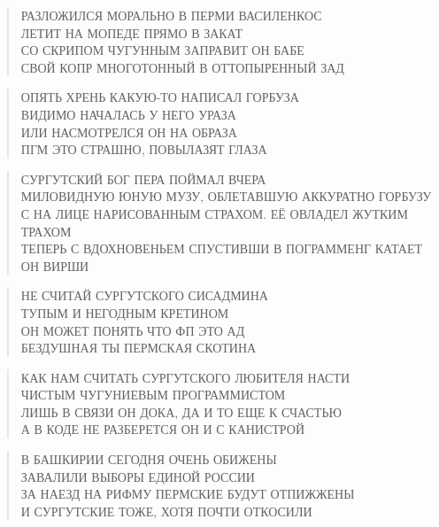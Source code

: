 \poemtitle{***}
\begin{verse}
РАЗЛОЖИЛСЯ МОРАЛЬНО В ПЕРМИ ВАСИЛЕНКОС\\
ЛЕТИТ НА МОПЕДЕ ПРЯМО В ЗАКАТ\\
СО СКРИПОМ ЧУГУННЫМ ЗАПРАВИТ ОН БАБЕ\\
СВОЙ КОПР МНОГОТОННЫЙ В ОТТОПЫРЕННЫЙ ЗАД
\end{verse}

\poemtitle{***}
\begin{verse}
ОПЯТЬ ХРЕНЬ КАКУЮ-ТО НАПИСАЛ ГОРБУЗА\\
ВИДИМО НАЧАЛАСЬ У НЕГО УРАЗА\\
ИЛИ НАСМОТРЕЛСЯ ОН НА ОБРАЗА\\
ПГМ ЭТО СТРАШНО, ПОВЫЛАЗЯТ ГЛАЗА
\end{verse}

\poemtitle{***}
\begin{verse}
СУРГУТСКИЙ БОГ ПЕРА ПОЙМАЛ ВЧЕРА\\
МИЛОВИДНУЮ ЮНУЮ МУЗУ, ОБЛЕТАВШУЮ АККУРАТНО ГОРБУЗУ\\
С НА ЛИЦЕ НАРИСОВАННЫМ СТРАХОМ. ЕЁ ОВЛАДЕЛ ЖУТКИМ ТРАХОМ\\
ТЕПЕРЬ С ВДОХНОВЕНЬЕМ СПУСТИВШИ В ПОГРАММЕНГ КАТАЕТ ОН ВИРШИ
\end{verse}

\poemtitle{***}
\begin{verse}
НЕ СЧИТАЙ СУРГУТСКОГО СИСАДМИНА\\
ТУПЫМ И НЕГОДНЫМ КРЕТИНОМ\\
ОН МОЖЕТ ПОНЯТЬ ЧТО ФП ЭТО АД\\
БЕЗДУШНАЯ ТЫ ПЕРМСКАЯ СКОТИНА
\end{verse}

\poemtitle{***}
\begin{verse}
КАК НАМ СЧИТАТЬ СУРГУТСКОГО ЛЮБИТЕЛЯ НАСТИ\\
ЧИСТЫМ ЧУГУНИЕВЫМ ПРОГРАММИСТОМ\\
ЛИШЬ В СВЯЗИ ОН ДОКА, ДА И ТО ЕЩЕ К СЧАСТЬЮ\\
А В КОДЕ НЕ РАЗБЕРЕТСЯ ОН И С КАНИСТРОЙ
\end{verse}

\poemtitle{***}
\begin{verse}
В БАШКИРИИ СЕГОДНЯ ОЧЕНЬ ОБИЖЕНЫ\\
ЗАВАЛИЛИ ВЫБОРЫ ЕДИНОЙ РОССИИ\\
ЗА НАЕЗД НА РИФМУ ПЕРМСКИЕ БУДУТ ОТПИЖЖЕНЫ\\
И СУРГУТСКИЕ ТОЖЕ, ХОТЯ ПОЧТИ ОТКОСИЛИ
\end{verse}

